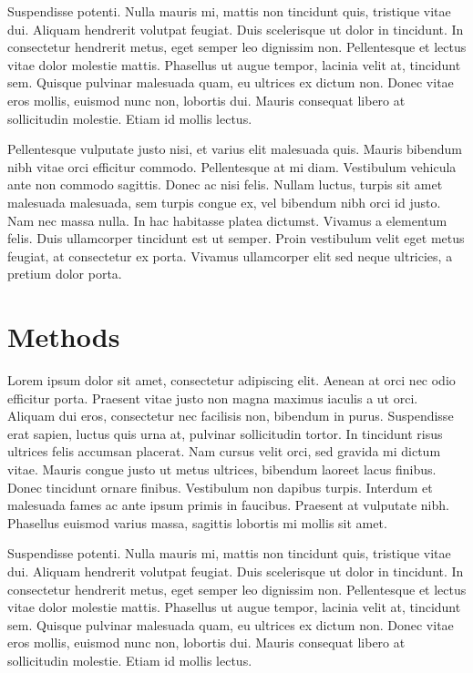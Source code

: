 \documentclass[12pt,]{article}
\begin{document}
Suspendisse potenti. Nulla mauris mi, mattis non tincidunt quis,
tristique vitae dui. Aliquam hendrerit volutpat feugiat. Duis
scelerisque ut dolor in tincidunt. In consectetur hendrerit metus, eget
semper leo dignissim non. Pellentesque et lectus vitae dolor molestie
mattis. Phasellus ut augue tempor, lacinia velit at, tincidunt sem.
Quisque pulvinar malesuada quam, eu ultrices ex dictum non. Donec vitae
eros mollis, euismod nunc non, lobortis dui. Mauris consequat libero at
sollicitudin molestie. Etiam id mollis lectus.

Pellentesque vulputate justo nisi, et varius elit malesuada quis. Mauris
bibendum nibh vitae orci efficitur commodo. Pellentesque at mi diam.
Vestibulum vehicula ante non commodo sagittis. Donec ac nisi felis.
Nullam luctus, turpis sit amet malesuada malesuada, sem turpis congue
ex, vel bibendum nibh orci id justo. Nam nec massa nulla. In hac
habitasse platea dictumst. Vivamus a elementum felis. Duis ullamcorper
tincidunt est ut semper. Proin vestibulum velit eget metus feugiat, at
consectetur ex porta. Vivamus ullamcorper elit sed neque ultricies, a
pretium dolor porta.

\hypertarget{methods}{%
\section{Methods}\label{methods}}

Lorem ipsum dolor sit amet, consectetur adipiscing elit. Aenean at orci
nec odio efficitur porta. Praesent vitae justo non magna maximus iaculis
a ut orci. Aliquam dui eros, consectetur nec facilisis non, bibendum in
purus. Suspendisse erat sapien, luctus quis urna at, pulvinar
sollicitudin tortor. In tincidunt risus ultrices felis accumsan
placerat. Nam cursus velit orci, sed gravida mi dictum vitae. Mauris
congue justo ut metus ultrices, bibendum laoreet lacus finibus. Donec
tincidunt ornare finibus. Vestibulum non dapibus turpis. Interdum et
malesuada fames ac ante ipsum primis in faucibus. Praesent at vulputate
nibh. Phasellus euismod varius massa, sagittis lobortis mi mollis sit
amet.

Suspendisse potenti. Nulla mauris mi, mattis non tincidunt quis,
tristique vitae dui. Aliquam hendrerit volutpat feugiat. Duis
scelerisque ut dolor in tincidunt. In consectetur hendrerit metus, eget
semper leo dignissim non. Pellentesque et lectus vitae dolor molestie
mattis. Phasellus ut augue tempor, lacinia velit at, tincidunt sem.
Quisque pulvinar malesuada quam, eu ultrices ex dictum non. Donec vitae
eros mollis, euismod nunc non, lobortis dui. Mauris consequat libero at
sollicitudin molestie. Etiam id mollis lectus.
\end{document}
